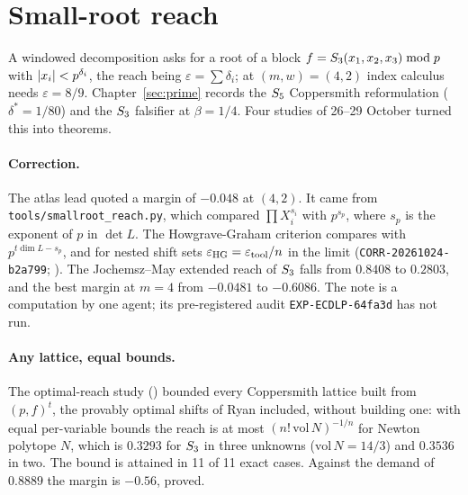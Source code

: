 \section{Small-root reach}\label{sec:pa-smallroot}

A windowed decomposition asks for a root of a block $f=S_{3}(x_1,x_2,x_3)
\bmod p$ with $\lvert x_i \rvert<p^{\delta_i}$, the reach being
$\varepsilon=\sum\delta_i$; at $(m,w)=(4,2)$ index calculus needs
$\varepsilon=8/9$. Chapter~\ref{sec:prime} records the $S_{5}$ Coppersmith
reformulation ($\delta^*=1/80$) and the $S_{3}$ falsifier at $\beta=1/4$.
Four studies of 26--29 October turned this into theorems.

\paragraph{Correction.} The atlas lead quoted a margin of $-0.048$ at
$(4,2)$. It came from \texttt{tools/smallroot\_reach.py}, which compared
$\prod X_i^{s_i}$ with $p^{s_p}$, where $s_p$ is the exponent of $p$ in
$\det L$. The Howgrave-Graham criterion compares with $p^{t\dim L-s_p}$,
and for nested shift sets $\varepsilon_{\rm HG}=\varepsilon_{\rm tool}/n$
in the limit (\texttt{CORR-20261024-b2a799};
). The
Jochemsz--May extended reach of $S_{3}$ falls from $0.8408$ to $0.2803$, and
the best margin at $m=4$ from $-0.0481$ to $-0.6086$. The note is a
computation by one agent; its pre-registered audit
\texttt{EXP-ECDLP-64fa3d} has not run.

\paragraph{Any lattice, equal bounds.} The optimal-reach study
() bounded every
Coppersmith lattice built from $(p,f)^t$, the provably optimal shifts of
Ryan included, without building one: with equal per-variable bounds the
reach is at most $(n!\,\mathrm{vol}\,N)^{-1/n}$ for Newton polytope $N$,
which is $0.3293$ for $S_{3}$ in three unknowns ($\mathrm{vol}\,N=14/3$) and
$0.3536$ in two. The bound is attained in 11 of 11 exact cases. Against the
demand of $0.8889$ the margin is $-0.56$, proved.

